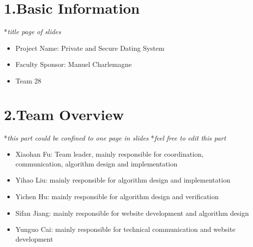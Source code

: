 \documentclass{article}
\begin{document}
\mdxtitleblockstart{}
\mdxauthorstart{}
\mdxauthorend\mdtitleauthorrunning{}{}\mdxtitleblockend%

\section{1.\hspace*{0.5em}Basic Information}\label{sec-basic-information}%

\noindent{}*\emph{title page of slides}%

\begin{itemize}[noitemsep,topsep=\mdcompacttopsep]%

\item{}Project Name: Private and Secure Dating System\mdbr%

\item{}Faculty Sponsor: Manuel Charlemagne\mdbr%

\item{}Team 28%
\end{itemize}%

\section{2.\hspace*{0.5em}Team Overview}\label{sec-team-overview}%

\noindent{}*\emph{this part could be confined to one page in slides}\mdbr
{}*\emph{feel free to edit this part}%

\begin{itemize}[noitemsep,topsep=\mdcompacttopsep]%

\item{}Xiaohan Fu: Team leader, mainly responsible for coordination, communication, algorithm design and implementation%

\item{}Yihao Liu: mainly responsible for algorithm design and implementation%

\item{}Yichen Hu: mainly responsible for algorithm design and verification%

\item{}Sifan Jiang: mainly responsible for website development and algorithm design%

\item{}Yunguo Cai: mainly responsible for technical communication and website development%
\end{itemize}%
\end{document}
